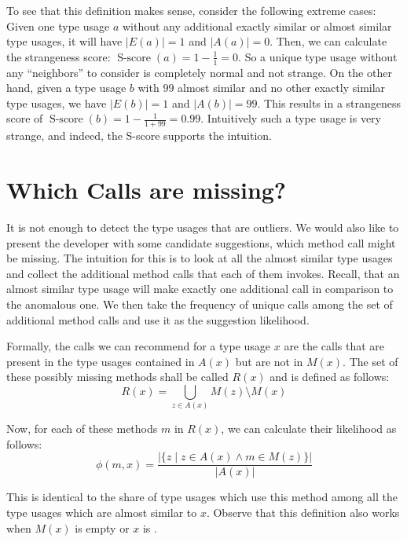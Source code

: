 To see that this definition makes sense, consider the following extreme cases:
Given one type usage $a$ without any additional exactly similar or almost similar type usages, it will have $|E(a)| = 1$ and $|A(a)| = 0$.
Then, we can calculate the strangeness score: $\operatorname{S-score}(a) = 1-\frac{1}{1} = 0$.
So a unique type usage without any ``neighbors'' to consider is completely normal and not strange.
On the other hand, given a type usage $b$ with $99$ almost similar and no other exactly similar type usages, we have $|E(b)| = 1$ and $|A(b)| = 99$.
This results in a strangeness score of $\operatorname{S-score}(b) = 1-\frac{1}{1+99} = 0.99$.
Intuitively such a type usage is very strange, and indeed, the S-score supports the intuition.

\section{Which Calls are missing?}

It is not enough to detect the type usages that are outliers.
We would also like to present the developer with some candidate suggestions, which method call might be missing.
The intuition for this is to look at all the almost similar type usages and collect the additional method calls that each of them invokes.
Recall, that an almost similar type usage will make exactly one additional call in comparison to the anomalous one.
We then take the frequency of unique calls among the set of additional method calls and use it as the suggestion likelihood.

Formally, the calls we can recommend for a type usage $x$ are the calls that are present in the type usages contained in $A(x)$ but are not in $M(x)$.
The set of these possibly missing methods shall be called $R(x)$ and is defined as follows:
\begin{equation*}
    R(x) = \bigcup_{z \in A(x)} M(z) \setminus M(x)
\end{equation*}

Now, for each of these methods $m$ in $R(x)$, we can calculate their likelihood as follows:
\begin{equation*}
    \phi(m, x) = \frac{|\{z \mid z \in A(x) \land m \in M(z)\}|}{|A(x)|}
\end{equation*}

This is identical to the share of type usages which use this method among all the type usages which are almost similar to $x$.
Observe that this definition also works when $M(x)$ is empty or $x$ is .

